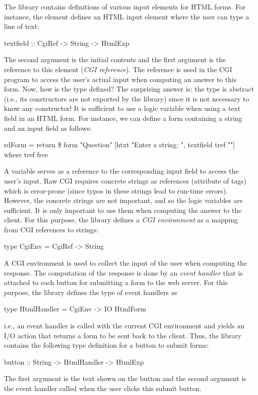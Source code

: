 The  library contains definitions of various input
elements for HTML forms.
For instance, the element  defines
an HTML input element where the user can type a line of text:
\begin{prog}
textfield :: CgiRef -> String -> HtmlExp
\end{prog}
The second argument is the initial contents and the first argument
is the reference to this element (\emph{CGI reference}).
The reference is used in the
CGI program to access the user's actual input when computing
an answer to this form.
Now, how is the type  defined?
The surprising answer is: the type is abstract (i.e., its constructors
are not exported by the  library) since
it is not necessary to know any constructor!
It is sufficient to use a logic variable when using a text field
in an HTML form.
For instance, we can define a form containing a string
and an input field as follows:
\begin{prog}
rdForm = return \$ form "Question"
          [htxt "Enter a string: ", textfield tref ""]
 where tref free
\end{prog}
A  variable serves as a reference to the corresponding
input field to access the user's input. Raw CGI requires concrete
strings as references (attribute  of  tags)
which is error-prone (since typos in these strings lead to
run-time errors).
However, the concrete strings are not important, and so the
logic variables are sufficient. It is only important
to use them when computing the answer to the client.
For this purpose, the  library defines
a \emph{CGI environment} as a mapping
from CGI references to strings:
\begin{prog}
type CgiEnv = CgiRef -> String
\end{prog}
A CGI environment is used to collect the input of the user
when computing the response. The computation of the response is done
by an \emph{event handler}
that is attached to each button for submitting a form to the web server.
For this purpose, the  library defines the type of event handlers as
\begin{prog}
type HtmlHandler = CgiEnv -> IO HtmlForm
\end{prog}
i.e., an event handler is called with the current CGI environment and
yields an I/O action that returns a form to be sent back to the client.
Thus, the  library contains the following type definition
for a button to submit forms:
\begin{prog}
button :: String -> HtmlHandler -> HtmlExp
\end{prog}
The first argument is the text shown on the button
and the second argument is the event handler called when the user
clicks this submit button.

